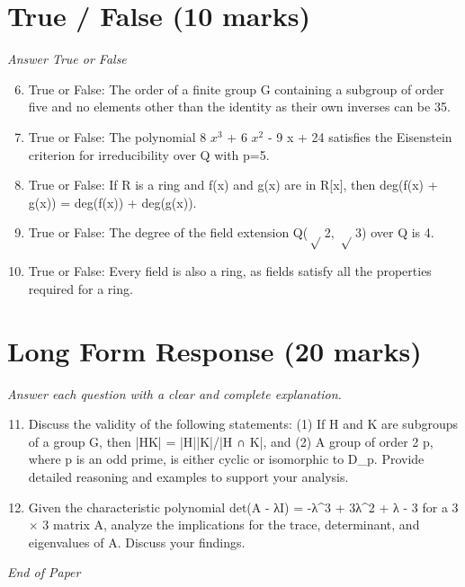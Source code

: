 \documentclass[12pt]{article}
\begin{document}
\section*{True / False (10 marks)}
\textit{Answer True or False}
\begin{enumerate}[label=\arabic*.]
\setcounter{enumi}{5}
\item True or False: The order of a finite group G containing a subgroup of order five and no elements other than the identity as their own inverses can be 35.
\item True or False: The polynomial 8 $x^3$ + 6 $x^2$ - 9 x + 24 satisfies the Eisenstein criterion for irreducibility over Q with p=5.
\item True or False: If R is a ring and f(x) and g(x) are in R[x], then deg(f(x) + g(x)) = deg(f(x)) + deg(g(x)).
\item True or False: The degree of the field extension Q(\ensuremath{\sqrt} 2, \ensuremath{\sqrt} 3) over Q is 4.
\item True or False: Every field is also a ring, as fields satisfy all the properties required for a ring.
\end{enumerate}

\section*{Long Form Response (20 marks)}
\textit{Answer each question with a clear and complete explanation.}
\begin{enumerate}[label=\arabic*.]
\setcounter{enumi}{10}
\item Discuss the validity of the following statements: (1) If H and K are subgroups of a group G, then |HK| = |H||K|/|H ∩ K|, and (2) A group of order 2 p, where p is an odd prime, is either cyclic or isomorphic to D\_p. Provide detailed reasoning and examples to support your analysis.
\item Given the characteristic polynomial det(A - λI) = -λ^3 + 3λ^2 + λ - 3 for a 3 \ensuremath{\times} 3 matrix A, analyze the implications for the trace, determinant, and eigenvalues of A. Discuss your findings.
\end{enumerate}

\vfill
\noindent\textit{End of Paper}
\end{document}
